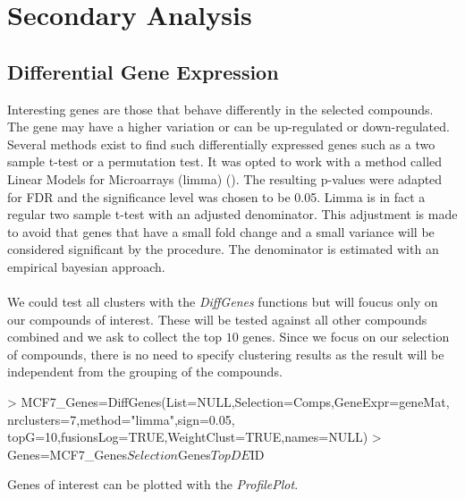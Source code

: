 \documentclass[a4paper]{article}
\begin{document}
\section{Secondary Analysis}
\subsection{Differential Gene Expression}
Interesting genes are those that behave differently in the selected compounds.
The gene may have a higher variation or can be up-regulated or down-regulated.
Several methods exist to find such differentially expressed genes such as a two
sample t-test or a permutation test. It was opted to work with a method called
Linear Models for Microarrays (limma) (\cite{Smyth2004}). The resulting p-values
were adapted for FDR and the significance level was chosen to be 0.05. Limma is
in fact a regular two sample t-test with an adjusted denominator. This
adjustment is made to avoid that genes that have a small fold change and a small
variance will be considered significant by the procedure. The denominator is
estimated with an empirical bayesian approach.\\ \\
We could test all clusters with the {\it DiffGenes} functions but will foucus
only on our compounds of interest. These will be tested against all other
compounds combined and we ask to collect the top $10$ genes. Since we focus on
our selection of compounds, there is no need to specify clustering results as
the result will be independent from the grouping of the compounds.
\begin{Schunk}
\begin{Sinput}
> MCF7_Genes=DiffGenes(List=NULL,Selection=Comps,GeneExpr=geneMat,
 		             nrclusters=7,method="limma",sign=0.05,
                      topG=10,fusionsLog=TRUE,WeightClust=TRUE,names=NULL)
> Genes=MCF7_Genes$Selection$Genes$TopDE$ID				  
\end{Sinput}
\end{Schunk}
Genes of interest can be plotted with the {\it ProfilePlot}.
\vspace{-0.3cm}
\end{document}
